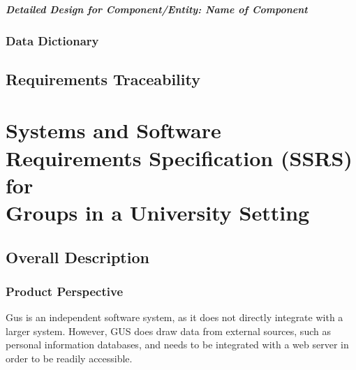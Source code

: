 \documentclass[12pt, oneside, letterpaper]{report}
\begin{document}
			\subsubsection{Detailed Design for Component/Entity: Name of Component}
	\section{Data Dictionary}
\chapter{Requirements Traceability}
\part{Systems and Software Requirements Specification (SSRS) \\ for \\ Groups in a University Setting}
\chapter{Overall Description}
	\section{Product Perspective}
		Gus is an independent software system, as it does not directly
		integrate with a larger system. However, GUS does draw data from
		external sources, such as personal information databases, and
		needs to be integrated with a web server in order to be readily
		accessible.
\end{document}
